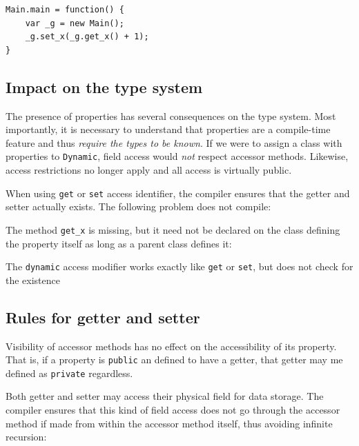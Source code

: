\documentclass[a4paper,oneside]{book}
\newcommand{\type}[1]{\texttt{#1}}
\newcommand{\expr}[1]{\texttt{#1}}
\newcommand{\haxe}[2][]{%
}
\begin{document}
\begin{lstlisting}
Main.main = function() {
	var _g = new Main();
	_g.set_x(_g.get_x() + 1);
}
\end{lstlisting}



\subsection{Impact on the type system}
\label{class-field-property-type-system-impact}

The presence of properties has several consequences on the type system. Most importantly, it is necessary to understand that properties are a compile-time feature and thus \emph{require the types to be known}. If we were to assign a class with properties to \type{Dynamic}, field access would \emph{not} respect accessor methods. Likewise, access restrictions no longer apply and all access is virtually public.

When using \expr{get} or \expr{set} access identifier, the compiler ensures that the getter and setter actually exists. The following problem does not compile:

\haxe{assets/Property4.hx}

The method \expr{get_x} is missing, but it need not be declared on the class defining the property itself as long as a parent class defines it:

\haxe{assets/Property5.hx}

The \expr{dynamic} access modifier works exactly like \expr{get} or \expr{set}, but does not check for the existence



\subsection{Rules for getter and setter}
\label{class-field-property-rules}

Visibility of accessor methods has no effect on the accessibility of its property. That is, if a property is \expr{public} an defined to have a getter, that getter may me defined as \expr{private} regardless.

Both getter and setter may access their physical field for data storage. The compiler ensures that this kind of field access does not go through the accessor method if made from within the accessor method itself, thus avoiding infinite recursion:

\haxe{assets/GetterSetter.hx}
\end{document}
